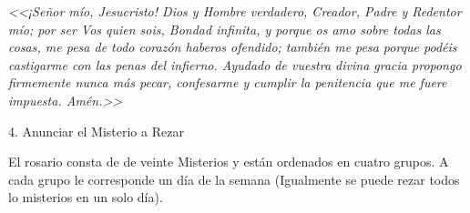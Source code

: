 \documentclass[12pt, letterpaper]{report}
\begin{document}
    \textit{<<¡Señor mío, Jesucristo! Dios y Hombre verdadero, Creador, Padre y Redentor mío; por ser Vos quien sois, Bondad infinita, y porque os amo sobre todas las cosas, me pesa de todo corazón haberos ofendido; también me pesa porque podéis castigarme con las penas del infierno. Ayudado de vuestra divina gracia propongo firmemente nunca más pecar, confesarme y cumplir la penitencia que me fuere impuesta. Amén.>>}
    
    
    \LARGE 4. Anunciar el Misterio a Rezar
    
    \Large El rosario consta de de veinte Misterios y están ordenados en cuatro grupos. A cada grupo le corresponde un día de la semana (Igualmente se puede rezar todos lo misterios en un solo día).
    
\end{document}
